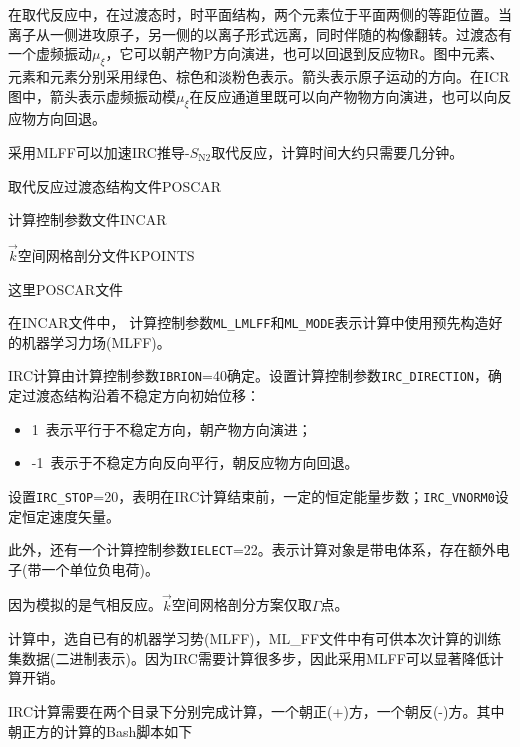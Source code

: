 在取代反应中，在过渡态时，时平面结构，两个元素位于平面两侧的等距位置。当离子从一侧进攻原子，另一侧的以离子形式远离，同时伴随的构像翻转。过渡态有一个虚频振动$\mu_{\xi}$，它可以朝产物\textrm{P}方向演进，也可以回退到反应物\textrm{R}。图中元素、元素和元素分别采用绿色、棕色和淡粉色表示。箭头表示原子运动的方向。在\textrm{ICR}图中，箭头表示虚频振动模$\mu_{\xi}$在反应通道里既可以向产物物方向演进，也可以向反应物方向回退。

采用\textrm{MLFF}可以加速\textrm{IRC}推导-$S_{\mathrm{N}2}$取代反应，计算时间大约只需要几分钟。

取代反应过渡态结构文件\textrm{POSCAR}

计算控制参数文件\textrm{INCAR}

$\vec k$空间网格剖分文件\textrm{KPOINTS}

这里\textrm{POSCAR}文件%

在\textrm{INCAR}文件中，%
计算控制参数\texttt{ML\_LMLFF}和\texttt{ML\_MODE}表示计算中使用预先构造好的机器学习力场\textrm{(MLFF)}。

\textrm{IRC}计算由计算控制参数\texttt{IBRION}=40确定。设置计算控制参数\texttt{IRC\_DIRECTION}，确定过渡态结构沿着不稳定方向初始位移：
\begin{itemize}
	\item 1~表示平行于不稳定方向，朝产物方向演进；
	\item -1~表示于不稳定方向反向平行，朝反应物方向回退。
\end{itemize}
设置\texttt{IRC\_STOP}=20，表明在\textrm{IRC}计算结束前，一定的恒定能量步数；\texttt{IRC\_VNORM0}设定恒定速度矢量。

此外，还有一个计算控制参数\texttt{IELECT}=22。表示计算对象是带电体系，存在额外电子(带一个单位负电荷)。

因为模拟的是气相反应。$\vec k$空间网格剖分方案仅取$\Gamma$点。

计算中，选自已有的机器学习势\textrm{(MLFF)}，\textrm{ML\_FF}文件中有可供本次计算的训练集数据(二进制表示)。因为\textrm{IRC}需要计算很多步，因此采用\textrm{MLFF}可以显著降低计算开销。%

\textrm{IRC}计算需要在两个目录下分别完成计算，一个朝正\textrm{(+)}方，一个朝反\textrm{(-)}方。其中朝正方的计算的\textrm{Bash}脚本如下

